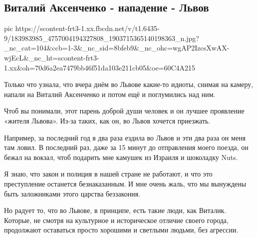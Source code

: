  
 
 
 
 
\subsection{Виталий Аксенченко - нападение - Львов}

\ifcmt
  pic https://scontent-frt3-1.xx.fbcdn.net/v/t1.6435-9/183983985_4757004194327808_1903715365140198363_n.jpg?_nc_cat=104&ccb=1-3&_nc_sid=8bfeb9&_nc_ohc=wgAP2IzcsXwAX-wjEcL&_nc_ht=scontent-frt3-1.xx&oh=70d6a2ea7479bb46f51da103e211cb05&oe=60C4A215
\fi


Только что узнала, что вчера днём во Львове какие-то идиоты, снимая на камеру,
напали на Виталий Аксенченко и потом ещё и поглумились над ним. 

Чтоб вы понимали, этот парень доброй души человек и он лучшее проявление
«жителя Львова». Из-за таких, как он, во Львов хочется приезжать. 

Например, за последний год я два раза ездила во Львов и эти два раза он меня
там ловил. В последний раз, даже за 15 минут до отправления моего поезда, он
бежал на вокзал, чтоб подарить мне камушек из Израиля и шоколадку Nuts. 

Я знаю, что закон и полиция в нашей стране не работают, и что это преступление
останется безнаказанным. И мне очень жаль, что мы вынуждены быть заложниками
этого царства беззакония.

Но радует то, что во Львове, в принципе, есть такие люди, как Виталик. Которые,
не смотря на культурное и историческое отличие своего города, продолжают
оставаться просто хорошими и светлыми людьми, без агрессии.
